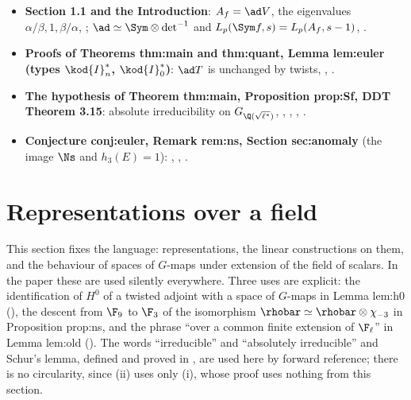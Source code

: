 \begin{itemize}
.
\item \textbf{Section 1.1 and the Introduction}: $A_f=\ad V$, the eigenvalues $\alpha/\beta,1,\beta/\alpha$, ; $\ad\simeq\Sym\otimes\det^{-1}$
and $L_p(\Sym f,s)=L_p(A_f,s-1)$, .
\item \textbf{Proofs of Theorems thm:main and thm:quant, Lemma lem:euler (types $\kod{I}_n^*$, $\kod{I}_0^*$)}: $\ad T$ is unchanged by twists,
, .
\item \textbf{The hypothesis of Theorem thm:main, Proposition prop:Sf, DDT Theorem 3.15}: absolute irreducibility on $G_{\Q(\sqrt{\ell^*})}$,
, , , .
\item \textbf{Conjecture conj:euler, Remark rem:ns, Section sec:anomaly} (the image $\Ns$ and $h_3(E)=1$): ,
, .
\end{itemize}

\section{Representations over a field}\label{sec:reps:field}

This section fixes the language: representations, the linear constructions on them, and the behaviour of spaces of
$G$-maps under extension of the field of scalars. In the paper these are used silently everywhere. Three uses are explicit:
the identification of $H^0$ of a twisted adjoint with a space of $G$-maps in Lemma lem:h0 (), the
descent from $\F_9$ to $\F_3$ of the isomorphism $\rhobar\simeq\rhobar\otimes\chi_{-3}$ in Proposition prop:ns, and the phrase ``over a
common finite extension of $\F_\ell$'' in Lemma lem:old (). The words ``irreducible'' and ``absolutely irreducible'' and
Schur's lemma, defined and proved in , are used here by forward reference; there is no circularity, since
(ii) uses only (i), whose proof uses nothing from this section.

